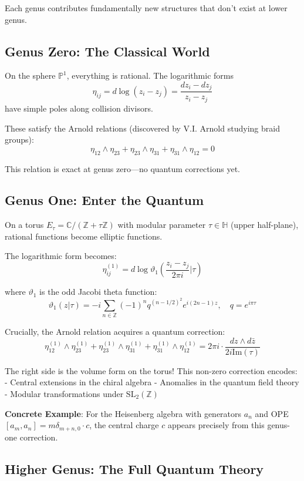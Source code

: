 Each genus contributes fundamentally new structures that don't exist at lower genus.

\subsection{Genus Zero: The Classical World}

On the sphere $\mathbb{P}^1$, everything is rational. The logarithmic forms
$$\eta_{ij} = d\log(z_i - z_j) = \frac{dz_i - dz_j}{z_i - z_j}$$
have simple poles along collision divisors.

These satisfy the Arnold relations (discovered by V.I. Arnold studying braid groups):
$$\eta_{12} \wedge \eta_{23} + \eta_{23} \wedge \eta_{31} + \eta_{31} \wedge \eta_{12} = 0$$

This relation is exact at genus zero—no quantum corrections yet.

\subsection{Genus One: Enter the Quantum}

On a torus $E_\tau = \mathbb{C}/(\mathbb{Z} + \tau\mathbb{Z})$ with modular parameter $\tau \in \mathbb{H}$ (upper half-plane), rational functions become elliptic functions.

The logarithmic form becomes:
$$\eta_{ij}^{(1)} = d\log\vartheta_1\left(\frac{z_i - z_j}{2\pi i}\Big|\tau\right)$$

where $\vartheta_1$ is the odd Jacobi theta function:
$$\vartheta_1(z|\tau) = -i\sum_{n \in \mathbb{Z}}(-1)^n q^{(n-1/2)^2}e^{i(2n-1)z}, \quad q = e^{i\pi\tau}$$

Crucially, the Arnold relation acquires a quantum correction:
$$\eta_{12}^{(1)} \wedge \eta_{23}^{(1)} + \eta_{23}^{(1)} \wedge \eta_{31}^{(1)} + \eta_{31}^{(1)} \wedge \eta_{12}^{(1)} = 2\pi i \cdot \frac{dz \wedge d\bar{z}}{2i\text{Im}(\tau)}$$

The right side is the volume form on the torus! This non-zero correction encodes:
- Central extensions in the chiral algebra
- Anomalies in the quantum field theory
- Modular transformations under $\text{SL}_2(\mathbb{Z})$

\textbf{Concrete Example}: For the Heisenberg algebra with generators $a_n$ and OPE $[a_m, a_n] = m\delta_{m+n,0} \cdot c$, the central charge $c$ appears precisely from this genus-one correction.

\subsection{Higher Genus: The Full Quantum Theory}

